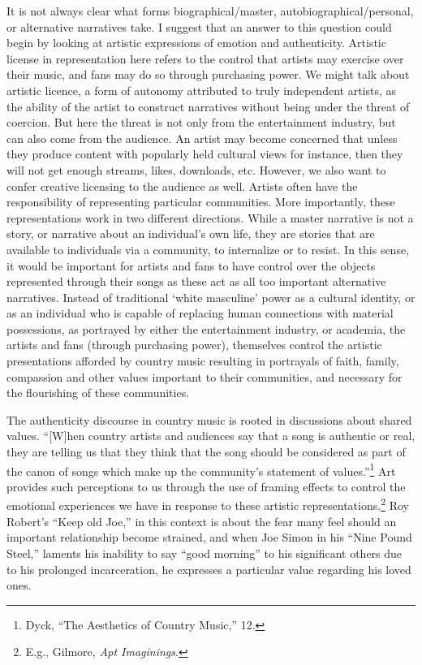 \documentclass[
  12pt,
]{book}
\theoremstyle{definition}
\theoremstyle{definition}
\theoremstyle{definition}
\theoremstyle{definition}
\theoremstyle{remark}
\begin{document}
It is not always clear what forms biographical/master, autobiographical/personal, or alternative narratives take. I suggest that an answer to this question could begin by looking at artistic expressions of emotion and authenticity. Artistic license in representation here refers to the control that artists may exercise over their music, and fans may do so through purchasing power. We might talk about artistic licence, a form of autonomy attributed to truly independent artists, as the ability of the artist to construct narratives without being under the threat of coercion. But here the threat is not only from the entertainment industry, but can also come from the audience. An artist may become concerned that unless they produce content with popularly held cultural views for instance, then they will not get enough streams, likes, downloads, etc. However, we also want to confer creative licensing to the audience as well. Artists often have the responsibility of representing particular communities. More importantly, these representations work in two different directions. While a master narrative is not a story, or narrative about an individual's own life, they are stories that are available to individuals via a community, to internalize or to resist. In this sense, it would be important for artists and fans to have control over the objects represented through their songs as these act as all too important alternative narratives. Instead of traditional `white masculine' power as a cultural identity, or as an individual who is capable of replacing human connections with material possessions, as portrayed by either the entertainment industry, or academia, the artists and fans (through purchasing power), themselves control the artistic presentations afforded by country music resulting in portrayals of faith, family, compassion and other values important to their communities, and necessary for the flourishing of these communities.

The authenticity discourse in country music is rooted in discussions about shared values. ``{[}W{]}hen country artists and audiences say that a song is authentic or real, they are telling us that they think that the song should be considered as part of the canon of songs which make up the community's statement of values.''\footnote{Dyck, {``The Aesthetics of Country Music,''} 12.} Art provides such perceptions to us through the use of framing effects to control the emotional experiences we have in response to these artistic representations.\footnote{E.g., Gilmore, \emph{Apt {Imaginings}}.} Roy Robert's ``Keep old Joe,'' in this context is about the fear many feel should an important relationship become strained, and when Joe Simon in his ``Nine Pound Steel,'' laments his inability to say ``good morning'' to his significant others due to his prolonged incarceration, he expresses a particular value regarding his loved ones.
\end{document}

